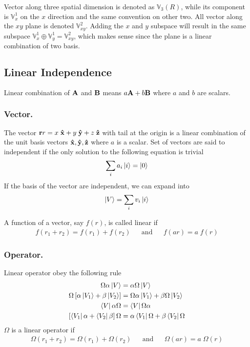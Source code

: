 \documentclass[../../../main.tex]{subfiles}
\begin{document}
Vector along three spatial dimension is denoted as $\mathbb{V}_3(R)$, while its component is $\mathbb{V}_x^1$ on the $x$ direction and the same convention on other two.
All vector along the $xy$ plane is denoted $\mathbb{V}_{xy}^2$.
Adding the $x$ and $y$ subspace will result in the same subspace $\mathbb{V}_x^1\oplus \mathbb{V}_y^1=\mathbb{V}_{xy}^2$, which makes sense since the plane is a linear combination of two basis.

\subsection{Linear Independence}
Linear combination of $\mathbf{A}$ and $\mathbf{B}$ means $a\mathbf{A} + b\mathbf{B}$ where $a$ and $b$ are scalars.

\subsubsection{Vector.}
The vector $\mathbf{r}r = x\;\mathbf{\hat{x}}+y\;\mathbf{\hat{y}}+z\;\mathbf{\hat{z}}$ with tail at the origin is a linear combination of the unit basis vectors $\mathbf{\hat{x}},\mathbf{\hat{y}},\mathbf{\hat{z}}$
where $a$ is a scalar.
Set of vectors are said to independent if the only solution to the following equation is trivial
\begin{equation*}
	\sum_i a_i\ket{i}=\ket{0}
\end{equation*}
If the basis of the vector are independent, we can expand into
\begin{equation*}
	\ket{V}=\sum_i v_i \ket{i}
\end{equation*}

A function of a vector, say $f (r)$, is called linear if
\begin{align*}
	f(r_1+r_2)= f(r_1)+ f(r_2) &  & \mathrm{and} &  & f(ar)=a\;f(r)
\end{align*}

\subsubsection{Operator.}
Linear operator obey the following rule
\begin{align*}
	\Omega \alpha \ket{V}                               & =\alpha\Omega \ket{V}                         \\
	\Omega\left[\alpha \ket{V_1}+\beta \ket{V_2}\right] & =\Omega\alpha \ket{V_1}+\beta\Omega \ket{V_2} \\
	\bra{V}\alpha\Omega                                 & =\bra{V}\Omega\alpha                          \\
	\left[\bra{V_1}\alpha+\bra{V_2}\beta\right]\Omega   & =\alpha \bra{V_1}\Omega +\beta\bra{V_2}\Omega
\end{align*}
$\Omega$ is a linear operator if
\begin{align*}
	\Omega(r_1+r_2)= \Omega(r_1)+ \Omega(r_2) &  & \mathrm{and} &  & \Omega(ar)=a\;\Omega(r)
\end{align*}
\end{document}
